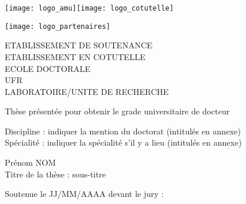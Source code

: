 \documentclass{amu_these}
\begin{document}
\titlepage
{}\selectfont{}
\vspace*{-2cm}
\begin{center}
	\begin{minipage}[c]{0.70\linewidth}
		\raggedright \texttt{[image: logo\_amu]}\quad\texttt{[image: logo\_cotutelle]}
	\end{minipage}\hfill
	\begin{minipage}[c]{0.30\linewidth}
		\raggedleft \texttt{[image: logo\_partenaires]}
	\end{minipage}\hfill 
\end{center}
\begin{flushleft}
	\vspace{0.2cm}
	\LARGE ETABLISSEMENT DE SOUTENANCE\\
	\LARGE\textcolor{black!50}{ETABLISSEMENT EN COTUTELLE}\\
	\Large ECOLE DOCTORALE\\
	\vspace{0.2cm}
	\normalsize UFR\\
	\vspace{0.2cm}
	LABORATOIRE/UNITE DE RECHERCHE\\
    \begin{center}
		\vspace{2cm}
		Thèse présentée pour obtenir le grade universitaire de docteur\\
    \end{center}
	\vspace{0.5cm}
    Discipline : indiquer la mention du doctorat (intitulés en annexe)\\
    Spécialité : indiquer la spécialité s'il y a lieu (intitulés en annexe)\\
    \begin{center}
        \vspace{0.5cm}
        \Large Prénom NOM\\
        \vspace{1cm}
        \large Titre de la thèse : sous-titre\\
    \end{center}
	\vspace{3.5cm}
    \normalsize Soutenue le JJ/MM/AAAA devant le jury :\\
\end{flushleft}
\vspace{0.4cm}
\end{document}
